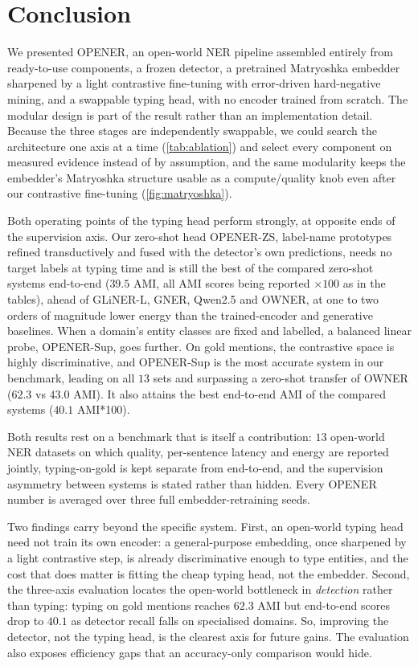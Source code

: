 \section{Conclusion}
\label{sec:conclusion}

We presented OPENER, an open-world NER pipeline assembled entirely from ready-to-use components, a frozen detector, a pretrained Matryoshka embedder sharpened by a light contrastive fine-tuning with error-driven hard-negative mining, and a swappable typing head, with no encoder trained from scratch.
The modular design is part of the result rather than an implementation detail. Because the three stages are independently swappable, we could search the architecture one axis at a time (\autoref{tab:ablation}) and select every component on measured evidence instead of by assumption, and the same modularity keeps the embedder's Matryoshka structure usable as a compute/quality knob even after our contrastive fine-tuning (\autoref{fig:matryoshka}).

Both operating points of the typing head perform strongly, at opposite ends of the supervision axis.
Our zero-shot head OPENER-ZS, label-name prototypes refined transductively and fused with the detector's own predictions, needs no target labels at typing time and is still the best of the compared zero-shot systems end-to-end ($39.5$ AMI, all AMI scores being reported $\times 100$ as in the tables), ahead of GLiNER-L, GNER, Qwen2.5 and OWNER, at one to two orders of magnitude lower energy than the trained-encoder and generative baselines.
When a domain's entity classes are fixed and labelled, a balanced linear probe, OPENER-Sup, goes further. On gold mentions, the contrastive space is highly discriminative, and OPENER-Sup is the most accurate system in our benchmark, leading on all $13$ sets and surpassing a zero-shot transfer of OWNER ($62.3$ vs $43.0$ AMI). It also attains the best end-to-end AMI of the compared systems ($40.1$ AMI*100).

Both results rest on a benchmark that is itself a contribution: $13$ open-world NER datasets on which quality, per-sentence latency and energy are reported jointly, typing-on-gold is kept separate from end-to-end, and the supervision asymmetry between systems is stated rather than hidden. Every OPENER number is averaged over three full embedder-retraining seeds.

Two findings carry beyond the specific system.
First, an open-world typing head need not train its own encoder: a general-purpose embedding, once sharpened by a light contrastive step, is already discriminative enough to type entities, and the cost that does matter is fitting the cheap typing head, not the embedder.
Second, the three-axis evaluation locates the open-world bottleneck in \emph{detection} rather than typing: typing on gold mentions reaches $62.3$ AMI but end-to-end scores drop to $40.1$ as detector recall falls on specialised domains. So, improving the detector, not the typing head, is the clearest axis for future gains. The evaluation also exposes efficiency gaps that an accuracy-only comparison would hide.

